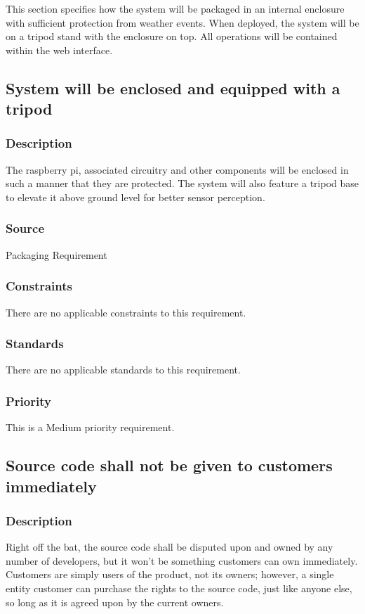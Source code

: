 This section specifies how the system will be packaged in an internal enclosure with sufficient protection from weather events. When deployed, the system will be on a tripod stand with the enclosure on top. All operations will be contained within the web interface.

\subsection{System will be enclosed and equipped with a tripod}
\subsubsection{Description}
The raspberry pi, associated circuitry and other components will be enclosed in such a manner that they are protected. The system will also feature a tripod base to elevate it above ground level for better sensor perception.
\subsubsection{Source}
Packaging Requirement
\subsubsection{Constraints}
There are no applicable constraints to this requirement.
\subsubsection{Standards}
There are no applicable standards to this requirement.
\subsubsection{Priority}
This is a Medium priority requirement.

\subsection{Source code shall not be given to customers immediately}
\subsubsection{Description}
Right off the bat, the source code shall be disputed upon and owned by any number of developers, but it won't be something customers can own immediately.  Customers are simply users of the product, not its owners; however, a single entity customer can purchase the rights to the source code, just like anyone else, so long as it is agreed upon by the current owners.
